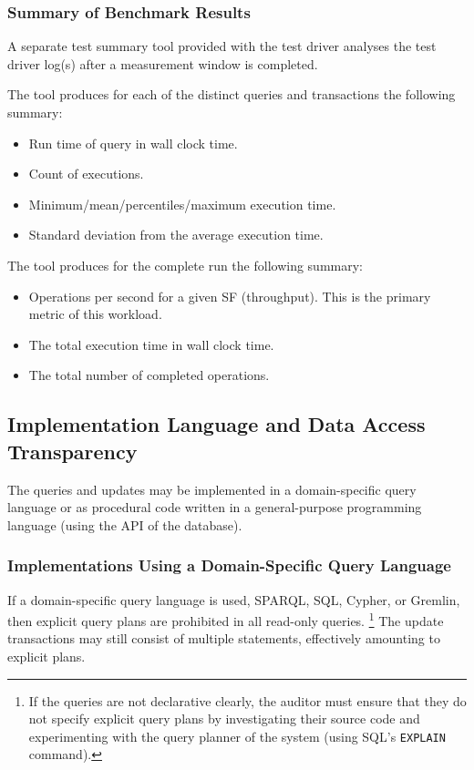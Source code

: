 \subsubsection{Summary of Benchmark Results}
\label{sec:performance-metrics}
A separate test summary tool provided with the test driver analyses the test driver log(s) after a measurement window is completed. 

The tool produces for each of the distinct queries and transactions the following summary:
\begin{itemize}
    \item Run time of query in wall clock time.
    \item Count of executions.
    \item Minimum/mean/percentiles/maximum execution time.
    \item Standard deviation from the average execution time.
\end{itemize}
The tool produces for the complete run the following summary:
\begin{itemize}
    \item Operations per second for a given SF (throughput). This is the primary metric of this workload.
    \item The total execution time in wall clock time.
    \item The total number of completed operations.
\end{itemize}


\subsection{Implementation Language and Data Access Transparency}

The queries and updates may be implemented in a domain-specific query language or as procedural code written in a general-purpose programming language (\eg using the API of the database).

\subsubsection{Implementations Using a Domain-Specific Query Language}
\label{sec:finbench-domain-specific-query-language}

If a domain-specific query language is used, \eg SPARQL, SQL, Cypher, or Gremlin, then explicit query plans are prohibited in all read-only queries.%
\footnote{If the queries are not declarative clearly, the auditor must ensure that they do not specify explicit query plans by investigating their source code and experimenting with the query planner of the system (\eg using SQL's \texttt{EXPLAIN} command).}
The update transactions may still consist of multiple statements, effectively amounting to explicit plans.

